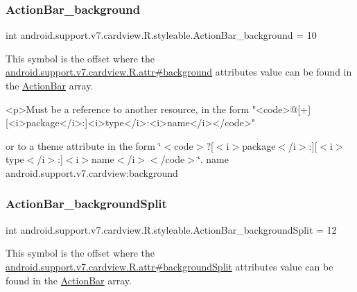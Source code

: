 \subsubsection{\texorpdfstring{Action\+Bar\+\_\+background}{ActionBar\_background}}
{\footnotesize\ttfamily int android.\+support.\+v7.\+cardview.\+R.\+styleable.\+Action\+Bar\+\_\+background = 10\hspace{0.3cm}{\ttfamily [static]}}

This symbol is the offset where the \hyperlink{classandroid_1_1support_1_1v7_1_1cardview_1_1R_1_1attr_a2c3c88c05e2e1f352d9729fda30281ac}{android.\+support.\+v7.\+cardview.\+R.\+attr\#background} attribute\textquotesingle{}s value can be found in the \hyperlink{classandroid_1_1support_1_1v7_1_1cardview_1_1R_1_1styleable_a0cbf7f776e31f78bb0a2b558daf176f8}{Action\+Bar} array.

\begin{DoxyVerb}      <p>Must be a reference to another resource, in the form "<code>@[+][<i>package</i>:]<i>type</i>:<i>name</i></code>"
\end{DoxyVerb}
 or to a theme attribute in the form \char`\"{}$<$code$>$?\mbox{[}$<$i$>$package$<$/i$>$\+:\mbox{]}\mbox{[}$<$i$>$type$<$/i$>$\+:\mbox{]}$<$i$>$name$<$/i$>$$<$/code$>$\char`\"{}.  name android.\+support.\+v7.\+cardview\+:background \mbox{\label{classandroid_1_1support_1_1v7_1_1cardview_1_1R_1_1styleable_a31aed5097d7cbebad3a2c4f5a9cee19a}} 
\subsubsection{\texorpdfstring{Action\+Bar\+\_\+background\+Split}{ActionBar\_backgroundSplit}}
{\footnotesize\ttfamily int android.\+support.\+v7.\+cardview.\+R.\+styleable.\+Action\+Bar\+\_\+background\+Split = 12\hspace{0.3cm}{\ttfamily [static]}}

This symbol is the offset where the \hyperlink{classandroid_1_1support_1_1v7_1_1cardview_1_1R_1_1attr_afaa578ea45659f58ba2319e9ff85da78}{android.\+support.\+v7.\+cardview.\+R.\+attr\#background\+Split} attribute\textquotesingle{}s value can be found in the \hyperlink{classandroid_1_1support_1_1v7_1_1cardview_1_1R_1_1styleable_a0cbf7f776e31f78bb0a2b558daf176f8}{Action\+Bar} array.

